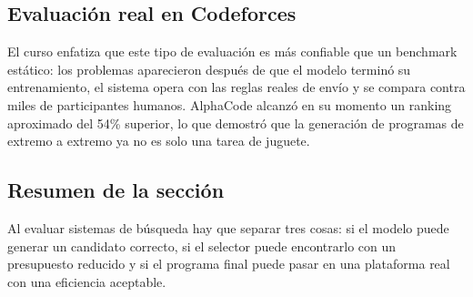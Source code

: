 \subsection{Evaluación real en Codeforces}


El curso enfatiza que este tipo de evaluación es más confiable que un benchmark estático: los problemas aparecieron después de que el modelo terminó su entrenamiento, el sistema opera con las reglas reales de envío y se compara contra miles de participantes humanos. AlphaCode alcanzó en su momento un ranking aproximado del 54\% superior, lo que demostró que la generación de programas de extremo a extremo ya no es solo una tarea de juguete.


\subsection{Resumen de la sección}

Al evaluar sistemas de búsqueda hay que separar tres cosas: si el modelo puede generar un candidato correcto, si el selector puede encontrarlo con un presupuesto reducido y si el programa final puede pasar en una plataforma real con una eficiencia aceptable.

